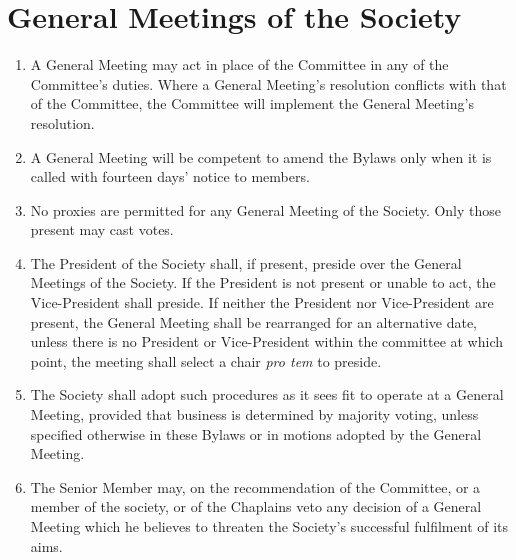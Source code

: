 \documentclass[11pt]{article}
\begin{document}
\section{General Meetings of the Society}
\begin{enumerate}
\item A General Meeting may act in place of the Committee in any of the Committee's duties. Where a General Meeting's resolution conflicts with that of the Committee, the Committee will implement the General Meeting's resolution.
\item A General Meeting will be competent to amend the Bylaws only when it is called with fourteen days' notice to members.
\item No proxies are permitted for any General Meeting of the Society. Only those present may cast votes.
\item The President of the Society shall, if present, preside over the General Meetings of the Society. If the President is not present or unable to act, the Vice-President shall preside. If neither the President nor Vice-President are present, the General Meeting shall be rearranged for an alternative date, unless there is no President or Vice-President within the committee at which point, the meeting shall select a chair \emph{pro tem} to preside. 
\item The Society shall adopt such procedures as it sees fit to operate at a General Meeting, provided that business is determined by majority voting, unless specified otherwise in these Bylaws or in motions adopted by the General Meeting.
\item The Senior Member may, on the recommendation of the Committee, or a member of the society, or of the Chaplains veto any decision of a General Meeting which he believes to threaten the Society's successful fulfilment of its aims.
\end{enumerate}
\end{document}
